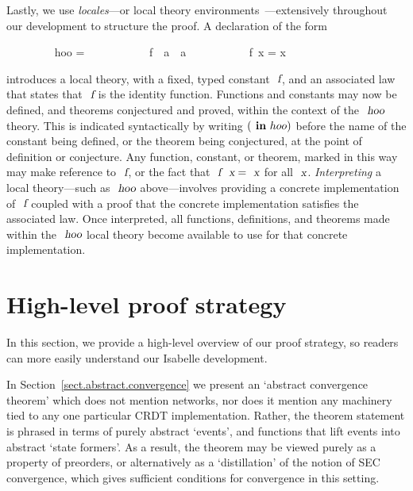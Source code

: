 \documentclass[acmlarge,review,anonymous]{acmart}\settopmatter{printfolios=true}
\begin{document}
Lastly, we use \emph{locales}---or local theory environments~\cite{DBLP:conf/tphol/KammullerWP99,DBLP:conf/types/HaftmannW08}---extensively throughout our development to structure the proof.
A declaration of the form
\\
\begin{isabellebody}
\ \ \ \ \ \ \ \  hoo = \isanewline
\ \ \ \ \ \ \ \ \ \ \ f\ {\isacharcolon}{\isacharcolon}\ {\isachardoublequoteopen}{\isacharprime}a\ {\isasymRightarrow}\ {\isacharprime}a{\isachardoublequoteclose}\isanewline
\ \ \ \ \ \ \ \ \ \  {\isachardoublequoteopen}f\ x = x{\isachardoublequoteclose}
\end{isabellebody}
\vspace{\baselineskip}
\noindent
introduces a local theory, with a fixed, typed constant $\isa{f}$, and an associated law that states that $\isa{f}$ is the identity function.
Functions and constants may now be defined, and theorems conjectured and proved, within the context of the $\isa{hoo}$ theory.
This is indicated syntactically by writing $(\isacommand{in}\ hoo)$ before the name of the constant being defined, or the theorem being conjectured, at the point of definition or conjecture.
Any function, constant, or theorem, marked in this way may make reference to $\isa{f}$, or the fact that $\isa{f}\ \isa{x} = \isa{x}$ for all $\isa{x}$.
\emph{Interpreting} a local theory---such as $\isa{hoo}$ above---involves providing a concrete implementation of $\isa{f}$ coupled with a proof that the concrete implementation satisfies the associated law.
Once interpreted, all functions, definitions, and theorems made within the $\isa{hoo}$ local theory become available to use for that concrete implementation.





\section{High-level proof strategy}
\label{sect.high-level.proof.strategy}

In this section, we provide a high-level overview of our proof strategy, so readers can more easily understand our Isabelle development.

In Section~\ref{sect.abstract.convergence} we present an `abstract convergence theorem' which does not mention networks, nor does it mention any machinery tied to any one particular CRDT implementation. 
Rather, the theorem statement is phrased in terms of purely abstract `events', and functions that lift events into abstract `state formers'.
As a result, the theorem may be viewed purely as a property of preorders, or alternatively as a `distillation' of the notion of SEC convergence, which gives sufficient conditions for convergence in this setting.
\end{document}
